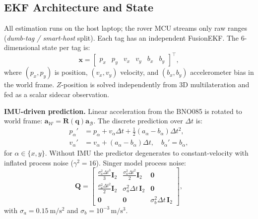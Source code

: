 
\subsection{EKF Architecture and State}

All estimation runs on the host laptop; the rover MCU streams only raw ranges
(\textit{dumb-tag / smart-host} split).
Each tag has an independent FusionEKF.
The 6-dimensional state per tag is:
\begin{equation}
  \mathbf{x} = \begin{bmatrix} p_x & p_y & v_x & v_y & b_x & b_y \end{bmatrix}^\top,
  \label{eq:state_vec}
\end{equation}
where $(p_x,p_y)$ is position, $(v_x,v_y)$ velocity, and $(b_x,b_y)$
accelerometer bias in the world frame.
$Z$-position is solved independently from 3D multilateration and fed as a
scalar sidecar observation.

\textbf{IMU-driven prediction.}
Linear acceleration from the BNO085 is rotated to world frame:
$\mathbf{a}_\mathcal{W} = \mathbf{R}(\mathbf{q})\mathbf{a}_\mathcal{B}$.
The discrete prediction over $\Delta t$ is:
\begin{align}
  p_\alpha' &= p_\alpha + v_\alpha\Delta t
    + \tfrac{1}{2}(a_\alpha - b_\alpha)\Delta t^2, \\
  v_\alpha' &= v_\alpha + (a_\alpha - b_\alpha)\Delta t,
  \quad b_\alpha' = b_\alpha,
\end{align}
for $\alpha \in \{x,y\}$.
Without IMU the predictor degenerates to constant-velocity
with inflated process noise ($\gamma^2 = 16$).
Singer model process noise:
\begin{equation}
  \mathbf{Q} = \begin{bmatrix}
    \frac{\sigma_a^2 \Delta t^3}{3}\mathbf{I}_2 &
    \frac{\sigma_a^2 \Delta t^2}{2}\mathbf{I}_2 & \mathbf{0} \\[4pt]
    \frac{\sigma_a^2 \Delta t^2}{2}\mathbf{I}_2 &
    \sigma_a^2\Delta t\,\mathbf{I}_2 & \mathbf{0} \\[4pt]
    \mathbf{0} & \mathbf{0} & \sigma_b^2\Delta t\,\mathbf{I}_2
  \end{bmatrix},
  \label{eq:Qmatrix}
\end{equation}
with $\sigma_a = \SI{0.15}{\metre\per\second\squared}$ and
$\sigma_b = 10^{-3}\,\si{\metre\per\second\cubed}$.

